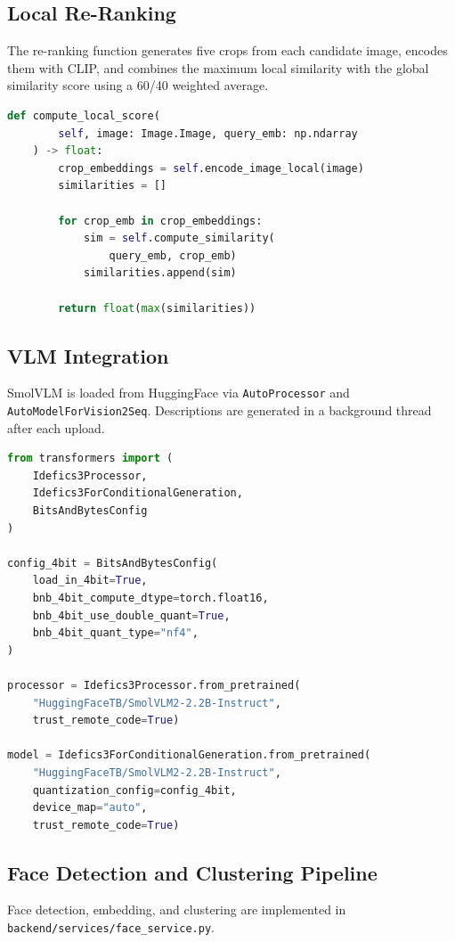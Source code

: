 \documentclass[12pt,a4paper,oneside]{report}
\begin{document}
\subsection{Local Re-Ranking}
The re-ranking function generates five crops from each candidate image,
encodes them with CLIP, and combines the maximum local similarity with
the global similarity score using a 60/40 weighted average.

\begin{lstlisting}[language=Python, caption={Local crop-based re-ranking
  (embedding\_service.py)}]
    def compute_local_score(
        self, image: Image.Image, query_emb: np.ndarray
    ) -> float:
        crop_embeddings = self.encode_image_local(image)
        similarities = []
        
        for crop_emb in crop_embeddings:
            sim = self.compute_similarity(
                query_emb, crop_emb)
            similarities.append(sim)
            
        return float(max(similarities))
\end{lstlisting}

\subsection{VLM Integration}
SmolVLM is loaded from HuggingFace via \texttt{AutoProcessor} and
\texttt{Auto\allowbreak ModelForVision2Seq}.  Descriptions are generated in a
background thread after each upload.

\begin{lstlisting}[language=Python, caption={SmolVLM description
  generation (vlm\_service.py)}]
from transformers import (
    Idefics3Processor,
    Idefics3ForConditionalGeneration,
    BitsAndBytesConfig
)

config_4bit = BitsAndBytesConfig(
    load_in_4bit=True,
    bnb_4bit_compute_dtype=torch.float16,
    bnb_4bit_use_double_quant=True,
    bnb_4bit_quant_type="nf4",
)

processor = Idefics3Processor.from_pretrained(
    "HuggingFaceTB/SmolVLM2-2.2B-Instruct",
    trust_remote_code=True)

model = Idefics3ForConditionalGeneration.from_pretrained(
    "HuggingFaceTB/SmolVLM2-2.2B-Instruct",
    quantization_config=config_4bit,
    device_map="auto",
    trust_remote_code=True)
\end{lstlisting}

\subsection{Face Detection and Clustering Pipeline}
Face detection, embedding, and clustering are implemented in
\texttt{backend/services/\allowbreak face\_service.py}.
\end{document}
